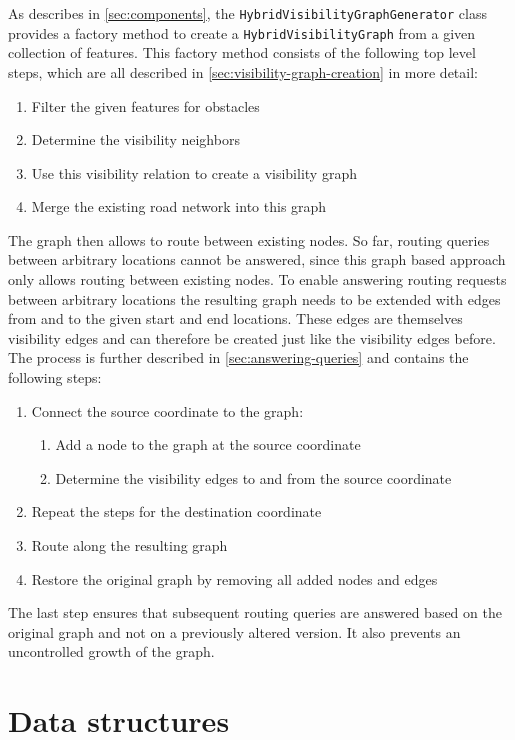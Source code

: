 		As describes in \cref{sec:components}, the \texttt{HybridVisibilityGraphGenerator} class provides a factory method to create a \texttt{HybridVisibilityGraph} from a given collection of features.
		This factory method consists of the following top level steps, which are all described in \cref{sec:visibility-graph-creation} in more detail:
		\begin{enumerate}
			\item Filter the given features for obstacles
			\item Determine the visibility neighbors
			\item Use this visibility relation to create a visibility graph
			\item Merge the existing road network into this graph
		\end{enumerate}
		The graph then allows to route between existing nodes.
		So far, routing queries between arbitrary locations cannot be answered, since this graph based approach only allows routing between existing nodes.
		To enable answering routing requests between arbitrary locations the resulting graph needs to be extended with edges from and to the given start and end locations.
		These edges are themselves visibility edges and can therefore be created just like the visibility edges before. The process is further described in \cref{sec:answering-queries} and contains the following steps:
		\begin{enumerate}
			\item Connect the source coordinate to the graph:
			\begin{enumerate}
				\item Add a node to the graph at the source coordinate
				\item Determine the visibility edges to and from the source coordinate
			\end{enumerate}
			\item Repeat the steps for the destination coordinate
			\item Route along the resulting graph
			\item Restore the original graph by removing all added nodes and edges
		\end{enumerate}
		The last step ensures that subsequent routing queries are answered based on the original graph and not on a previously altered version.
		It also prevents an uncontrolled growth of the graph.
	
\section{Data structures}
	
